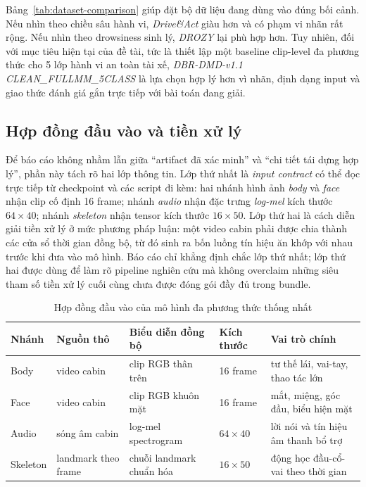\documentclass[conference,a4paper]{IEEEtran}
\begin{document}
Bảng~\ref{tab:dataset-comparison} giúp đặt bộ dữ liệu đang dùng vào đúng bối cảnh. Nếu nhìn theo chiều sâu hành vi, \textit{Drive\&Act} giàu hơn và có phạm vi nhãn rất rộng. Nếu nhìn theo drowsiness sinh lý, \textit{DROZY} lại phù hợp hơn. Tuy nhiên, đối với mục tiêu hiện tại của đề tài, tức là thiết lập một baseline clip-level đa phương thức cho 5 lớp hành vi an toàn tài xế, \textit{DBR-DMD-v1.1 CLEAN\_FULLMM\_5CLASS} là lựa chọn hợp lý hơn vì nhãn, định dạng input và giao thức đánh giá gắn trực tiếp với bài toán đang giải.

\subsection{Hợp đồng đầu vào và tiền xử lý}
Để báo cáo không nhầm lẫn giữa ``artifact đã xác minh'' và ``chi tiết tái dựng hợp lý'', phần này tách rõ hai lớp thông tin. Lớp thứ nhất là \textit{input contract} có thể đọc trực tiếp từ checkpoint và các script đi kèm: hai nhánh hình ảnh \textit{body} và \textit{face} nhận clip cố định 16 frame; nhánh \textit{audio} nhận đặc trưng \textit{log-mel} kích thước $64 \times 40$; nhánh \textit{skeleton} nhận tensor kích thước $16 \times 50$. Lớp thứ hai là cách diễn giải tiền xử lý ở mức phương pháp luận: một video cabin phải được chia thành các cửa sổ thời gian đồng bộ, từ đó sinh ra bốn luồng tín hiệu ăn khớp với nhau trước khi đưa vào mô hình. Báo cáo chỉ khẳng định chắc lớp thứ nhất; lớp thứ hai được dùng để làm rõ pipeline nghiên cứu mà không overclaim những siêu tham số tiền xử lý cuối cùng chưa được đóng gói đầy đủ trong bundle.

\begin{table}[t]
\caption{Hợp đồng đầu vào của mô hình đa phương thức thống nhất}
\label{tab:input-contract}
\centering
\scriptsize
\begin{tabular}{L{0.85cm}L{1.15cm}L{1.2cm}L{0.95cm}L{1.65cm}}
\toprule
Nhánh & Nguồn thô & Biểu diễn đồng bộ & Kích thước & Vai trò chính \\
\midrule
Body & video cabin & clip RGB thân trên & 16 frame & tư thế lái, vai-tay, thao tác lớn \\
Face & video cabin & clip RGB khuôn mặt & 16 frame & mắt, miệng, góc đầu, biểu hiện mặt \\
Audio & sóng âm cabin & log-mel spectrogram & $64 \times 40$ & lời nói và tín hiệu âm thanh bổ trợ \\
Skeleton & landmark theo frame & chuỗi landmark chuẩn hóa & $16 \times 50$ & động học đầu-cổ-vai theo thời gian \\
\bottomrule
\end{tabular}
\end{table}
\end{document}
